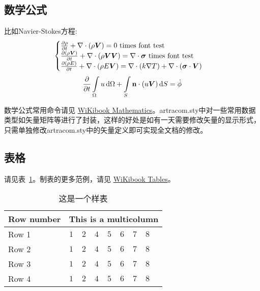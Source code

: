 \subsection{数学公式}

比如Navier-Stokes方程:
\begin{equation} \label{eq:ns}
    \begin{cases}
        \frac{\partial \rho}{\partial t} + \nabla\cdot(\rho\Vector{V}) = 0 \ \mathrm{times\ font\ test}\\
        \frac{\partial (\rho\Vector{V})}{\partial t} + \nabla\cdot(\rho\Vector{V}\Vector{V}) = \nabla\cdot\Tensor{\sigma} \ \text{times font test}\\
        \frac{\partial (\rho E)}{\partial t} + \nabla\cdot(\rho E\Vector{V}) = \nabla\cdot(k\nabla T) + \nabla\cdot(\Tensor{\sigma}\cdot\Vector{V})
    \end{cases}
\end{equation}
\begin{equation}
    \frac{\partial }{\partial t}\int\limits_{\Omega} u \, \mathrm{d}\Omega + \int\limits_{S} \boldsymbol{\mathbf{n}}\cdot(u\boldsymbol{V}) \, \mathrm{d}S = \dot{\phi}
\end{equation}

数学公式常用命令请见 \href{https://en.wikibooks.org/wiki/LaTeX/Mathematics}{WiKibook Mathematics}。artracom.sty中对一些常用数据类型如矢量矩阵等进行了封装，这样的好处是如有一天需要修改矢量的显示形式，只需单独修改artracom.sty中的矢量定义即可实现全文档的修改。

\subsection{表格}

请见表~\ref{tab:sample}。制表的更多范例，请见 \href{https://en.wikibooks.org/wiki/LaTeX/Tables}{WiKibook Tables}。
\begin{table}[!htbp]
    \caption{这是一个样表}
    \label{tab:sample}
    \centering
    \footnotesize%
    \setlength{\tabcolsep}{4pt}%
    \renewcommand{\arraystretch}{1.2}%
    \begin{tabular}{lcccccccc}
        \hline
        Row number & \multicolumn{8}{c}{This is a multicolumn} \\
        \hline
        Row 1 & $1$ & $2$ & $4$ & $5$ & $6$ & $7$ & $8$\\
        Row 2 & $1$ & $2$ & $4$ & $5$ & $6$ & $7$ & $8$\\
        Row 3 & $1$ & $2$ & $4$ & $5$ & $6$ & $7$ & $8$\\
        Row 4 & $1$ & $2$ & $4$ & $5$ & $6$ & $7$ & $8$\\
        \hline
    \end{tabular}
\end{table}

